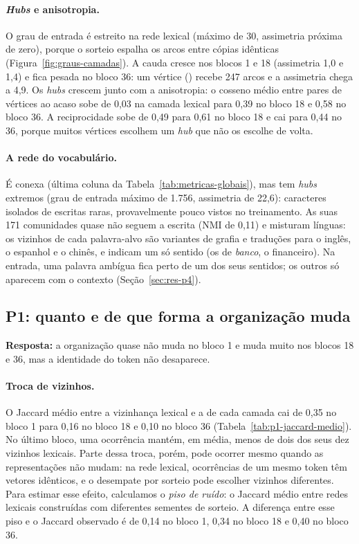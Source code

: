 \paragraph{\emph{Hubs} e anisotropia.} O grau de entrada é estreito na rede lexical (máximo de
30, assimetria próxima de zero), porque o sorteio espalha os arcos entre cópias idênticas
(Figura~\ref{fig:graus-camadas}). A cauda cresce nos blocos 1 e 18 (assimetria 1,0 e 1,4) e
fica pesada no bloco 36: um vértice () recebe 247 arcos e a assimetria
chega a 4,9. Os \emph{hubs} crescem junto com a anisotropia: o cosseno médio entre
pares de vértices ao acaso sobe de 0,03 na camada lexical para 0,39 no bloco 18 e 0,58 no
bloco 36. A reciprocidade sobe de 0,49 para 0,61 no bloco 18 e cai para 0,44 no 36, porque
muitos vértices escolhem um \emph{hub} que não os escolhe de volta.

\paragraph{A rede do vocabulário.} É conexa (última coluna da
Tabela~\ref{tab:metricas-globais}), mas tem \emph{hubs} extremos (grau de entrada máximo de 1.756, assimetria de 22,6): caracteres isolados
de escritas raras, provavelmente pouco vistos no treinamento. As suas 171 comunidades quase não
seguem a escrita (NMI de 0,11) e misturam línguas: os vizinhos de cada palavra-alvo são
variantes de grafia e traduções para o inglês, o espanhol e o chinês, e indicam um só sentido
(os de \emph{banco}, o financeiro). Na entrada, uma palavra ambígua fica perto de um dos seus
sentidos; os outros só aparecem com o contexto (Seção~\ref{sec:res-p4}).

\subsection{P1: quanto e de que forma a organização muda}\label{sec:res-p1}

\textbf{Resposta:} a organização quase não muda no bloco 1 e muda muito nos blocos 18 e 36, mas
a identidade do token não desaparece.

\paragraph{Troca de vizinhos.} O Jaccard médio entre a vizinhança lexical e a de cada camada cai
de 0,35 no bloco 1 para 0,16 no bloco 18 e 0,10 no bloco 36 (Tabela~\ref{tab:p1-jaccard-medio}).
No último bloco, uma ocorrência mantém, em média, menos de dois dos seus dez vizinhos lexicais.
Parte dessa troca, porém, pode ocorrer mesmo quando as representações não mudam: na rede lexical,
ocorrências de um mesmo token têm vetores idênticos, e o desempate por sorteio pode escolher
vizinhos diferentes. Para estimar esse efeito, calculamos o \emph{piso de ruído}: o Jaccard médio
entre redes lexicais construídas com diferentes sementes de sorteio. A diferença entre esse piso e
o Jaccard observado é de 0,14 no bloco 1, 0,34 no bloco 18 e 0,40 no bloco 36.

